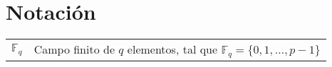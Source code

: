 \newpage{\pagestyle{empty}}
\chapter*{Notación}

\renewcommand{\arraystretch}{1.5}

\begin{longtable}{l p{13.7cm}}
	$\mathbb{F}_q$ & Campo finito de $q$ elementos, tal que $\mathbb{F}_q = \{0, 1, \hdots, p-1\}$\\
\end{longtable}
